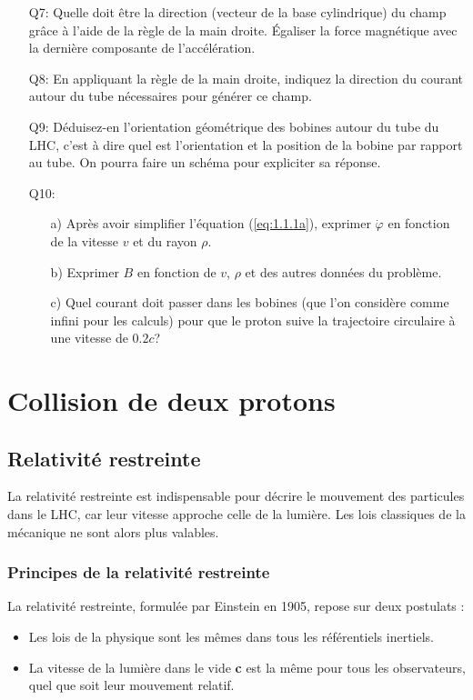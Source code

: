 \documentclass[14pt]{article}
\begin{document}
\begin{enumerate}
    \item[Q7:] Quelle doit être la direction (vecteur de la base cylindrique) du champ grâce à l'aide de la règle de la main droite. Égaliser la force magnétique avec la dernière composante de l'accélération.
    \item[Q8:] En appliquant la règle de la main droite, indiquez la direction du courant autour du tube nécessaires pour générer ce champ.
    \item[Q9:] Déduisez-en l'orientation géométrique des bobines autour du tube du LHC, c'est à dire quel est l'orientation et la position de la bobine par rapport au tube. On pourra faire un schéma pour expliciter sa réponse. 
    \item[Q10:] 
    \begin{enumerate}
        \item[a)] Après avoir simplifier l'équation (\ref{eq:1.1.1a}), exprimer $\dot{\varphi}$ en fonction de la vitesse $v$ et du rayon $\rho$.
        \item[b)] Exprimer $B$ en fonction de $v$, $\rho$ et des autres données du problème.
        \item[c)] Quel courant doit passer dans les bobines (que l'on considère comme infini pour les calculs) pour que le proton suive la trajectoire circulaire à une vitesse de $0.2c$? 
    \end{enumerate}
\end{enumerate}

\section{Collision de deux protons}\label{colision}

\subsection{Relativité restreinte}\label{relat}

La relativité restreinte est indispensable pour décrire le mouvement des particules dans le LHC, car leur vitesse approche celle de la lumière. Les lois classiques de la mécanique ne sont alors plus valables.

\subsubsection{Principes de la relativité restreinte}\label{relatP}

La relativité restreinte, formulée par Einstein en 1905, repose sur deux postulats :
\begin{itemize}
    \item Les lois de la physique sont les mêmes dans tous les référentiels inertiels.
    \item La vitesse de la lumière dans le vide \textbf{c} est la même pour tous les observateurs, quel que soit leur mouvement relatif.
\end{itemize}
\end{document}
